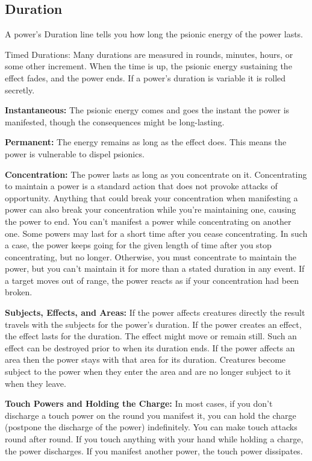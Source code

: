 \subsection{Duration}
A power's Duration line tells you how long the psionic energy of the power lasts.

Timed Durations: Many durations are measured in rounds, minutes, hours, or some other increment. When the time is up, the psionic energy sustaining the effect fades, and the power ends. If a power's duration is variable it is rolled secretly.

\textbf{Instantaneous:} The psionic energy comes and goes the instant the power is manifested, though the consequences might be long-lasting.

\textbf{Permanent:} The energy remains as long as the effect does. This means the power is vulnerable to dispel psionics.

\textbf{Concentration:} The power lasts as long as you concentrate on it. Concentrating to maintain a power is a standard action that does not provoke attacks of opportunity. Anything that could break your concentration when manifesting a power can also break your concentration while you're maintaining one, causing the power to end. You can't manifest a power while concentrating on another one. Some powers may last for a short time after you cease concentrating. In such a case, the power keeps going for the given length of time after you stop concentrating, but no longer. Otherwise, you must concentrate to maintain the power, but you can't maintain it for more than a stated duration in any event. If a target moves out of range, the power reacts as if your concentration had been broken.

\textbf{Subjects, Effects, and Areas:} If the power affects creatures directly the result travels with the subjects for the power's duration. If the power creates an effect, the effect lasts for the duration. The effect might move or remain still. Such an effect can be destroyed prior to when its duration ends. If the power affects an area then the power stays with that area for its duration. Creatures become subject to the power when they enter the area and are no longer subject to it when they leave.

\textbf{Touch Powers and Holding the Charge:} In most cases, if you don't discharge a touch power on the round you manifest it, you can hold the charge (postpone the discharge of the power) indefinitely. You can make touch attacks round after round. If you touch anything with your hand while holding a charge, the power discharges. If you manifest another power, the touch power dissipates.

